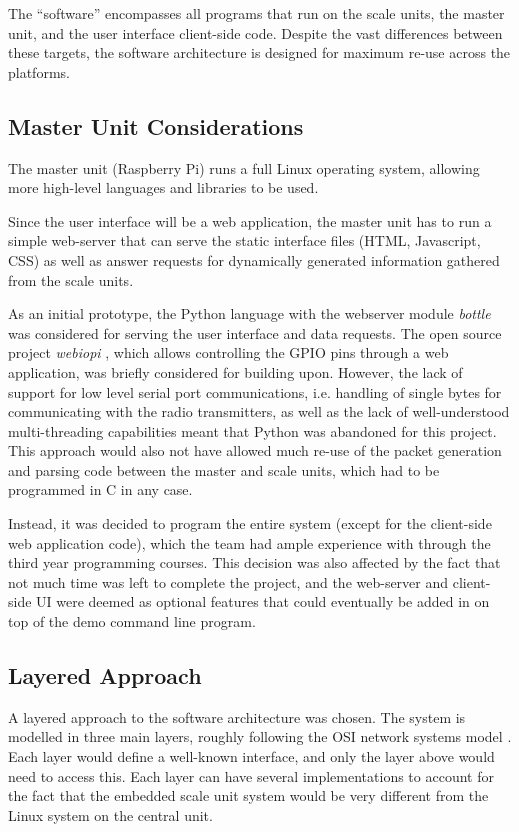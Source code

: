 The ``software'' encompasses all programs that run on the scale units, the master unit, and the user interface client-side code. Despite the vast differences between these targets, the software architecture is designed for maximum re-use across the platforms.

\subsection{Master Unit Considerations}
The master unit (Raspberry Pi) runs a full Linux operating system, allowing more high-level languages and libraries to be used.

Since the user interface will be a web application, the master unit has to run a simple web-server that can serve the static interface files (HTML, Javascript, CSS) as well as answer requests for dynamically generated information gathered from the scale units.

As an initial prototype, the Python language with the webserver module \emph{bottle} \cite{bottle-py} was considered for serving the user interface and data requests. The open source project \emph{webiopi} \cite{webiopi}, which allows controlling the GPIO pins through a web application, was briefly considered for building upon. However, the lack of support for low level serial port communications, i.e. handling of single bytes for communicating with the radio transmitters, as well as the lack of well-understood multi-threading capabilities meant that Python was abandoned for this project. This approach would also not have allowed much re-use of the packet generation and parsing code between the master and scale units, which had to be programmed in C in any case.

Instead, it was decided to program the entire system (except for the client-side web application code), which the team had ample experience with through the third year programming courses. This decision was also affected by the fact that not much time was left to complete the project, and the web-server and client-side UI were deemed as optional features that could eventually be added in on top of the demo command line program.

\subsection{Layered Approach}
A layered approach to the software architecture was chosen. The system is modelled in three main layers, roughly following the OSI network systems model \cite{osi-model}. Each layer would define a well-known interface, and only the layer above would need to access this. Each layer can have several implementations to account for the fact that the embedded scale unit system would be very different from the Linux system on the central unit.

